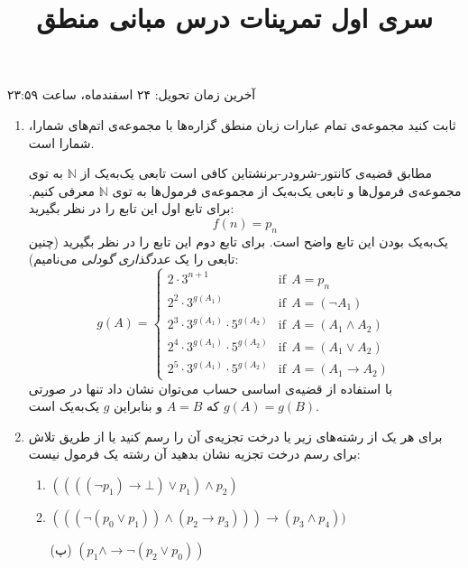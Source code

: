 \documentclass[12pt, 14paper]{article}
\title{سری اول تمرینات درس مبانی منطق}
\author{}
\date{}
\begin{document}
\maketitle

\vspace{-2.5cm}

\begin{center}آخرین زمان تحویل: ۲۴ اسفندماه، ساعت ۲۳:۵۹\end{center}

\vspace{0.5cm}

\begin{enumerate}

\item
ثابت کنید مجموعه‌ی تمام عبارات زبان منطق گزاره‌ها با مجموعه‌ی اتم‌های شمارا، شمارا است.
\begin{ans}
  مطابق قضیه‌ی کانتور-شرودر-برنشتاین کافی است تابعی یک‌به‌یک از $\mathbb{N}$ به توی مجموعه‌ی فرمول‌ها و تابعی یک‌به‌یک از مجموعه‌ی فرمول‌ها به توی $\mathbb{N}$ معرفی کنیم. برای تابع اول این تابع را در نظر بگیرید:
  $$
  f(n)=p_n
  $$
  یک‌به‌یک بودن  این تابع واضح است. برای تابع دوم این تابع را در نظر بگیرید (چنین تابعی را یک \emph{عددگذاری گودلی} می‌نامیم):
  $$
  g(A)=
  \begin{cases}
  2\cdot 3^{n+1} & \text{if}~~A = p_n\\
  2^2\cdot 3^{g(A_1)} & \text{if}~~A=(\neg A_1)\\
  2^3\cdot 3^{g(A_1)}\cdot 5^{g(A_2)} & \text{if}~~A=(A_1\wedge A_2) \\
  2^4\cdot 3^{g(A_1)}\cdot 5^{g(A_2)} & \text{if}~~A=(A_1\vee A_2) \\
  2^5\cdot 3^{g(A_1)}\cdot 5^{g(A_2)} & \text{if}~~A=(A_1\rightarrow A_2)
  \end{cases}
  $$
  با استفاده از قضیه‌ی اساسی حساب می‌توان نشان داد تنها در صورتی $g(A)=g(B)$ که $A=B$ و بنابراین $g$ یک‌به‌یک است.  
\end{ans}
\item
برای هر یک از رشته‌های زیر یا درخت تجزیه‌ی آن را رسم کنید یا از طریق تلاش برای رسم درخت تجزیه نشان بدهید آن رشته یک فرمول نیست:
\begin{enumerate}
\item $((((\neg p_1)\rightarrow\bot)\vee p_1)\wedge p_2)$
\item $(((\neg (p_0\vee p_1))\wedge(p_2\rightarrow p_3)))\rightarrow (p_3\wedge p_4))$
\item[(پ)] $(p_1\wedge\rightarrow\neg(p_2\vee p_0))$
\end{enumerate}


\end{enumerate}
\end{document}
